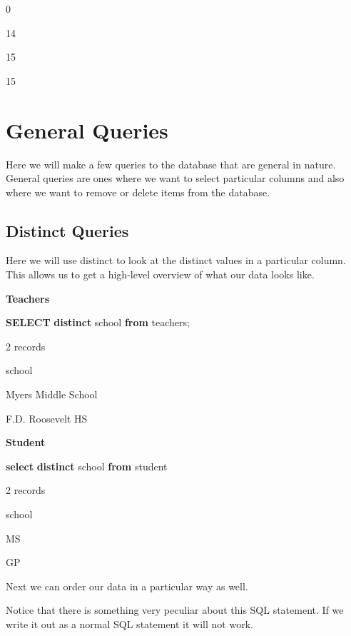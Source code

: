 \documentclass[]{book}
\newenvironment{Shaded}{\begin{snugshade}}{\end{snugshade}}
\newcommand{\KeywordTok}[1]{\textcolor[rgb]{0.13,0.29,0.53}{\textbf{#1}}}
\newcommand{\NormalTok}[1]{#1}
\begin{document}
0

14

15

15

\chapter{General Queries}\label{general-queries}

Here we will make a few queries to the database that are general in
nature. General queries are ones where we want to select particular
columns and also where we want to remove or delete items from the
database.

\section{Distinct Queries}\label{distinct-queries}

Here we will use distinct to look at the distinct values in a particular
column. This allows us to get a high-level overview of what our data
looks like.

\textbf{Teachers}

\begin{Shaded}
\begin{Highlighting}[]
\KeywordTok{SELECT} \KeywordTok{distinct}\NormalTok{ school }\KeywordTok{from}\NormalTok{ teachers;}
\end{Highlighting}
\end{Shaded}

\label{tab:unnamed-chunk-18}2 records

school

Myers Middle School

F.D. Roosevelt HS

\textbf{Student}

\begin{Shaded}
\begin{Highlighting}[]
\KeywordTok{select} \KeywordTok{distinct}\NormalTok{ school }\KeywordTok{from}\NormalTok{ student}
\end{Highlighting}
\end{Shaded}

\label{tab:unnamed-chunk-19}2 records

school

MS

GP

Next we can order our data in a particular way as well.

Notice that there is something very peculiar about this SQL statement.
If we write it out as a normal SQL statement it will not work.
\end{document}
